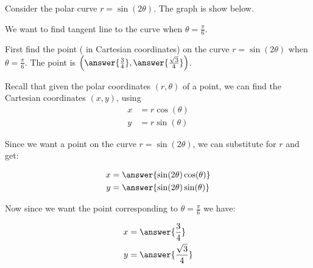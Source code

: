 \documentclass{ximera}
\author{Jason Miller}
\begin{document}
\begin{exercise}


Consider the polar curve $r=\sin(2\theta)$. The graph is show below. 




\begin{image}  
\end{image} 

We want to find tangent line to the curve when $\theta=\frac{\pi}{6}$. 

First find the point ( in Cartesian coordinates) on the curve $r=\sin(2\theta)$ when $\theta=\frac{\pi}{6}$. 
The point is $\left( \answer{ \frac{3}{4}},  \answer{ \frac{\sqrt{3}}{4}} \right)$. 

\begin{hint}

Recall that given the polar coordinates $(r,\theta)$ of a point, we can find the Cartesian coordinates $(x, y)$, using
\begin{align*}
x&=r\cos(\theta) \\
y&=r\sin(\theta)
\end{align*}

Since we want a point on the curve $r=\sin(2\theta)$, we can substitute for $r$ and get:

\begin{align*}
x&=\answer{\sin(2\theta)\cos(\theta)} \\
y&=\answer{\sin(2\theta)\sin(\theta) }
\end{align*}

Now since we want the point corresponding to $\theta=\frac{\pi}{6}$ we have:


\begin{align*}
x&=\answer{ \frac{3}{4} } \\
y&=\answer{\frac{\sqrt{3}}{4}  }
\end{align*}


\end{hint}
\end{exercise}
\end{document}
